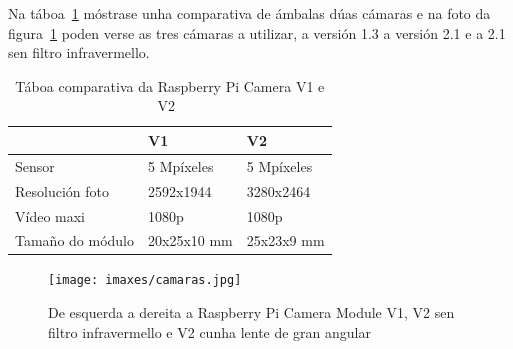  Na táboa~\ref{tab:comparativa_camaras} móstrase unha comparativa de ámbalas dúas cámaras e na foto da figura~\ref{fig:camaras} poden verse as tres cámaras a utilizar, a versión 1.3 a versión 2.1 e a 2.1 sen filtro infravermello.
\begin{table}[tbp]
    \label{tab:comparativa_camaras}
    \caption{Táboa comparativa da Raspberry Pi Camera V1 e V2~\cite{mocqRaspberryPiPi2017}}
    \begin{center}
        \begin{tabular}{|l|l||l|}
            \hline
              &  V1 & V2\\ \hline
             Sensor  & 5 Mpíxeles & 5 Mpíxeles \\ \hline
             Resolución foto  & 2592x1944 & 3280x2464 \\ \hline
             Vídeo maxi & 1080p & 1080p \\ \hline
             Tamaño do módulo& 20x25x10 mm & 25x23x9 mm \\ \hline
        \end{tabular}
    \end{center}
\end{table}

\begin{figure}[tbp]
  \centering
  \texttt{[image: imaxes/camaras.jpg]}
  \caption{De esquerda a dereita a Raspberry Pi Camera Module V1, V2 sen filtro infravermello e V2 cunha lente de gran angular}
  \label{fig:camaras}
\end{figure}

